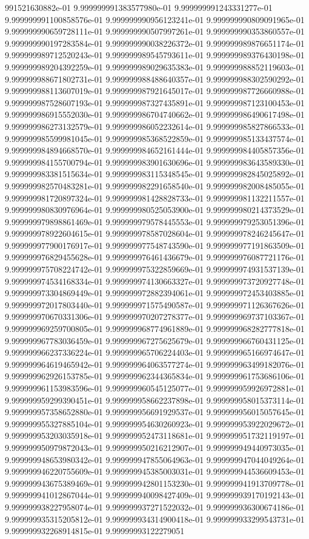 991521630882e-01	9.999999991383577980e-01	9.999999991243331277e-01	9.999999991100858576e-01	9.999999990956123241e-01	9.999999990809091965e-01	9.999999990659728111e-01	9.999999990507997261e-01	9.999999990353860557e-01	9.999999990197283584e-01	9.999999990038226372e-01	9.999999989876651174e-01	9.999999989712520243e-01	9.999999989545793611e-01	9.999999989376430198e-01	9.999999989204392259e-01	9.999999989029635383e-01	9.999999988852119603e-01	9.999999988671802731e-01	9.999999988488640357e-01	9.999999988302590292e-01	9.999999988113607019e-01	9.999999987921645017e-01	9.999999987726660988e-01	9.999999987528607193e-01	9.999999987327435891e-01	9.999999987123100453e-01	9.999999986915552030e-01	9.999999986704740662e-01	9.999999986490617498e-01	9.999999986273132579e-01	9.999999986052232614e-01	9.999999985827866533e-01	9.999999985599981045e-01	9.999999985368522859e-01	9.999999985133437574e-01	9.999999984894668570e-01	9.999999984652161444e-01	9.999999984405857356e-01	9.999999984155700794e-01	9.999999983901630696e-01	9.999999983643589330e-01	9.999999983381515634e-01	9.999999983115348545e-01	9.999999982845025892e-01	9.999999982570483281e-01	9.999999982291658540e-01	9.999999982008485055e-01	9.999999981720897324e-01	9.999999981428828733e-01	9.999999981132211557e-01	9.999999980830976964e-01	9.999999980525053900e-01	9.999999980214373529e-01	9.999999979898861469e-01	9.999999979578445553e-01	9.999999979253051396e-01	9.999999978922604615e-01	9.999999978587028604e-01	9.999999978246245647e-01	9.999999977900176917e-01	9.999999977548743590e-01	9.999999977191863509e-01	9.999999976829455628e-01	9.999999976461436679e-01	9.999999976087721176e-01	9.999999975708224742e-01	9.999999975322859669e-01	9.999999974931537139e-01	9.999999974534168334e-01	9.999999974130663327e-01	9.999999973720927748e-01	9.999999973304869449e-01	9.999999972882394061e-01	9.999999972453403885e-01	9.999999972017803440e-01	9.999999971575490587e-01	9.999999971126367626e-01	9.999999970670331306e-01	9.999999970207278377e-01	9.999999969737103367e-01	9.999999969259700805e-01	9.999999968774961889e-01	9.999999968282777818e-01	9.999999967783036459e-01	9.999999967275625679e-01	9.999999966760431125e-01	9.999999966237336224e-01	9.999999965706224403e-01	9.999999965166974647e-01	9.999999964619465942e-01	9.999999964063577274e-01	9.999999963499182076e-01	9.999999962926153785e-01	9.999999962344365834e-01	9.999999961753686106e-01	9.999999961153983596e-01	9.999999960545125077e-01	9.999999959926972881e-01	9.999999959299390451e-01	9.999999958662237898e-01	9.999999958015373114e-01	9.999999957358652880e-01	9.999999956691929537e-01	9.999999956015057645e-01	9.999999955327885104e-01	9.999999954630260923e-01	9.999999953922029672e-01	9.999999953203035918e-01	9.999999952473118681e-01	9.999999951732119197e-01	9.999999950979872043e-01	9.999999950216212907e-01	9.999999949440973035e-01	9.999999948653980342e-01	9.999999947855064963e-01	9.999999947044049264e-01	9.999999946220755609e-01	9.999999945385003031e-01	9.999999944536609453e-01	9.999999943675389469e-01	9.999999942801153230e-01	9.999999941913709778e-01	9.999999941012867044e-01	9.999999940098427409e-01	9.999999939170192143e-01	9.999999938227958074e-01	9.999999937271522032e-01	9.999999936300674186e-01	9.999999935315205812e-01	9.999999934314900418e-01	9.999999933299543731e-01	9.999999932268914815e-01	9.99999993122279051